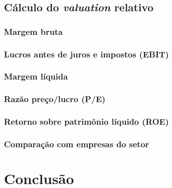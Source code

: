 \documentclass[grad,numbers]{coppe}
\begin{document}
  \hypertarget{cuxe1lculo-do-valuation-relativo}{%
  \section{\texorpdfstring{Cálculo do \emph{valuation} relativo}{Cálculo do valuation relativo}}\label{cuxe1lculo-do-valuation-relativo}}

  \hypertarget{margem-bruta}{%
  \subsection{Margem bruta}\label{margem-bruta}}

  \hypertarget{lucros-antes-de-juros-e-impostos-ebit}{%
  \subsection{Lucros antes de juros e impostos (EBIT)}\label{lucros-antes-de-juros-e-impostos-ebit}}

  \hypertarget{margem-luxedquida}{%
  \subsection{Margem líquida}\label{margem-luxedquida}}

  \hypertarget{razuxe3o-preuxe7olucro-pe}{%
  \subsection{Razão preço/lucro (P/E)}\label{razuxe3o-preuxe7olucro-pe}}

  \hypertarget{retorno-sobre-patrimuxf4nio-luxedquido-roe}{%
  \subsection{Retorno sobre patrimônio líquido (ROE)}\label{retorno-sobre-patrimuxf4nio-luxedquido-roe}}

  \hypertarget{comparauxe7uxe3o-com-empresas-do-setor}{%
  \subsection{Comparação com empresas do setor}\label{comparauxe7uxe3o-com-empresas-do-setor}}

  \hypertarget{conclusuxe3o}{%
  \chapter{Conclusão}\label{conclusuxe3o}}
\end{document}
